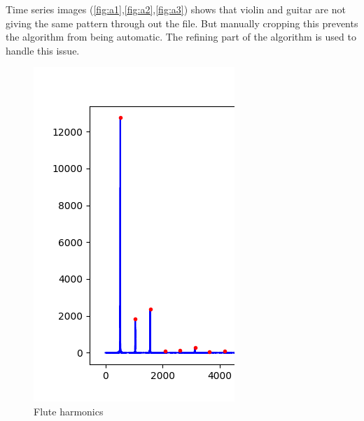 \documentclass{article}
\begin{document}
Time series images (\ref{fig:a1},\ref{fig:a2},\ref{fig:a3}) shows that violin and guitar are not giving the same pattern through out the file. But manually cropping this prevents the algorithm from being automatic. The refining part of the algorithm is used to handle this issue.

\begin{figure}[!htbp]
  \includegraphics[width=\linewidth]{flute-harmonics-cropped.png}
  \caption{Flute harmonics}\label{fig:b1}
\endminipage\hfill
{}

\end{figure}
\end{document}
